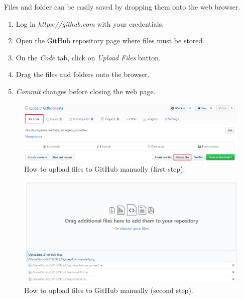 \begin{itemize}
    
    Files and folder can be easily saved by dropping them onto the web browser.
    
    \begin{enumerate}
    	\item Log in \textit{https://github.com} with your credentials.
    	\item Open the GitHub repository page where files must be stored.
    	\item On the \textit{Code} tab, click on \textit{Upload Files} button.
    	\item Drag the files and folders onto the browser.
    	\item \textit{Commit} changes before closing the web page. 	
    \end{enumerate}	
\end{itemize}

\begin{figure}[h]
	\centering
	\includegraphics[width=\textwidth]{Figures/GUP0.png}
	\caption{How to upload files to GitHub manually (first step).}
	\label{fig:GitHubUpload0}
\end{figure}

\begin{figure}[h]
	\centering
	\includegraphics[width= \textwidth]{Figures/GUP1.png}
	\caption{How to upload files to GitHub manually (second step).}
	\label{fig:GitHubUpload1}
\end{figure}

